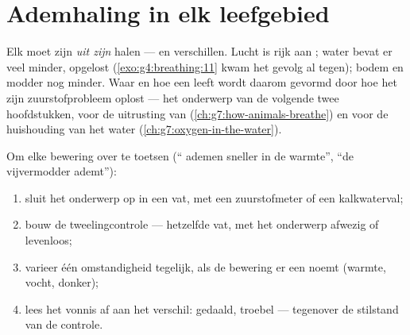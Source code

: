 \section{Ademhaling in elk leefgebied}

\begin{proposition}\label{prop:g7:what-is-respiration:habitats}
Elk  moet zijn  \emph{uit zijn } halen ---
en  verschillen. Lucht is rijk aan ; water bevat er
veel minder, opgelost (\cref{exo:g4:breathing:11} kwam het gevolg al
tegen); bodem en modder nog minder. Waar en hoe een  leeft
wordt daarom gevormd door hoe het zijn zuurstofprobleem oplost --- het
onderwerp van de volgende twee hoofdstukken, voor de uitrusting van
 (\cref{ch:g7:how-animals-breathe}) en voor de huishouding van het
water (\cref{ch:g7:oxygen-in-the-water}).
\end{proposition}
\admitted

\begin{method}\label{met:g7:what-is-respiration:test}
Om elke bewering over  te toetsen (`` ademen sneller in de
warmte'', ``de vijvermodder ademt''):
\begin{enumerate}
  \item sluit het onderwerp op in een vat, met een zuurstofmeter of een
        kalkwaterval;
  \item bouw de tweelingcontrole --- hetzelfde vat, met het onderwerp
        afwezig of levenloos;
  \item varieer één omstandigheid tegelijk, als de bewering er een noemt
        (warmte, vocht, donker);
  \item lees het vonnis af aan het verschil:  gedaald, 
        troebel --- tegenover de stilstand van de controle.
\end{enumerate}
\end{method}

